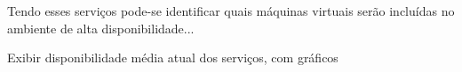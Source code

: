 Tendo esses serviços pode-se identificar quais máquinas virtuais serão incluídas no ambiente de alta disponibilidade...

Exibir disponibilidade média atual dos serviços, com gráficos



